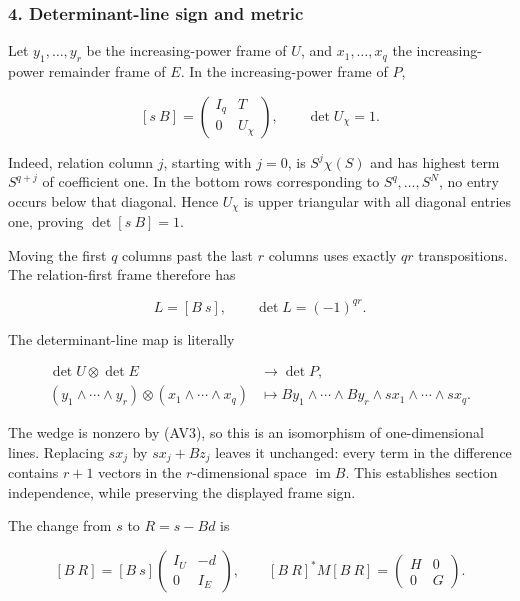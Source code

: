 \subsubsection{4. Determinant-line sign and metric}\label{endpoint-variation_review--determinant-line-sign-and-metric}

Let \(y_1,\ldots,y_r\) be the increasing-power frame of \(U\), and \(x_1,\ldots,x_q\) the increasing-power remainder frame of \(E\). In the increasing-power frame of \(P\),

\[
[s\ B]=
\begin{pmatrix}I_q&T\\0&U_\chi\end{pmatrix},\qquad
\det U_\chi=1.
\tag{AV12}
\]

Indeed, relation column \(j\), starting with \(j=0\), is \(S^j\chi(S)\) and has highest term \(S^{q+j}\) of coefficient one. In the bottom rows corresponding to \(S^q,\ldots,S^N\), no entry occurs below that diagonal. Hence \(U_\chi\) is upper triangular with all diagonal entries one, proving \(\det[s\ B]=1\).

Moving the first \(q\) columns past the last \(r\) columns uses exactly \(qr\) transpositions. The relation-first frame therefore has

\[
L=[B\ s],\qquad \det L=(-1)^{qr}.
\tag{AV13}
\]

The determinant-line map is literally

\[
\begin{aligned}
\det U\otimes\det E&\longrightarrow\det P,\\
(y_1\wedge\cdots\wedge y_r)\otimes(x_1\wedge\cdots\wedge x_q)
&\longmapsto
By_1\wedge\cdots\wedge By_r
\wedge sx_1\wedge\cdots\wedge sx_q .
\end{aligned}
\tag{AV14}
\]

The wedge is nonzero by (AV3), so this is an isomorphism of one-dimensional lines. Replacing \(sx_j\) by \(sx_j+Bz_j\) leaves it unchanged: every term in the difference contains \(r+1\) vectors in the \(r\)-dimensional space \(\operatorname{im}B\). This establishes section independence, while preserving the displayed frame sign.

The change from \(s\) to \(R=s-Bd\) is

\[
[B\ R]=[B\ s]
\begin{pmatrix}I_U&-d\\0&I_E\end{pmatrix},
\qquad
[B\ R]^*M[B\ R]=
\begin{pmatrix}H&0\\0&G\end{pmatrix}.
\tag{AV15}
\]

